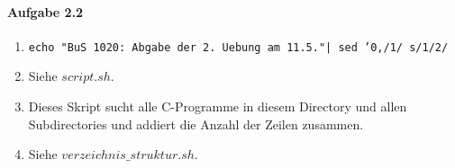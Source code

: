 \documentclass[11pt]{article}
\begin{document}

\paragraph{Aufgabe 2.2}
\begin{enumerate}[label = \alph*)]
\item \texttt{echo "BuS 1020: Abgabe der 2. Uebung am 11.5."| sed '0,/1/ s/1/2/}

\item Siehe $script.sh$.

\item Dieses Skript sucht alle C-Programme in diesem Directory und allen Subdirectories und addiert die Anzahl der Zeilen zusammen.

\item Siehe $verzeichnis\_struktur.sh$.

\end{enumerate}
\end{document}
